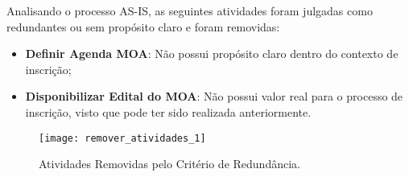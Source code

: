 Analisando o processo AS-IS, as seguintes atividades foram julgadas como redundantes ou sem propósito claro e foram removidas:
\begin{itemize}
	\item{\textbf{Definir Agenda MOA}: Não possui propósito claro dentro do contexto de inscrição;}
	\item{\textbf{Disponibilizar Edital do MOA}: Não possui valor real para o processo de inscrição, visto que pode ter sido realizada anteriormente.}
\end{itemize}
\begin{figure}[H]
	\centering
	\texttt{[image: remover\_atividades\_1]}
	\label{fig:atividaderemovidaum}
	\caption[Atividades Removidas pelo Critério de Redundância]{Atividades Removidas pelo Critério de Redundância.}
\end{figure}